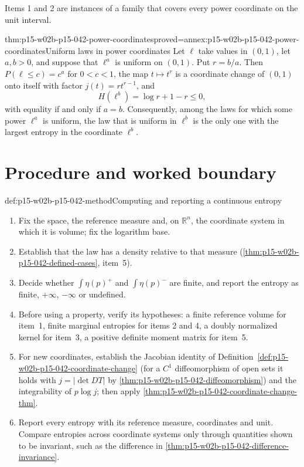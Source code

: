 Items 1 and 2 are instances of a family that covers every power coordinate on
the unit interval.

\begin{hbcorollary}{thm:p15-w02b-p15-042-power-coordinates}{proved=annex:p15-w02b-p15-042-power-coordinates}{Uniform laws in power coordinates}
Let \(\ell\) take values in \((0,1)\), let \(a,b>0\), and suppose that
\(\ell^a\) is uniform on \((0,1)\). Put \(r=b/a\). Then
\(P(\ell\leq c)=c^a\) for \(0<c<1\), the map \(t\mapsto t^r\) is a
coordinate change of \((0,1)\) onto itself with factor \(j(t)=rt^{r-1}\),
and
\[
 H(\ell^b)=\log r+1-r\leq0 ,
\]
with equality if and only if \(a=b\). Consequently, among the laws for which
some power \(\ell^a\) is uniform, the law that is uniform in \(\ell^b\) is the
only one with the largest entropy in the coordinate \(\ell^b\).
\end{hbcorollary}

\section{Procedure and worked boundary}
\label{sec:p15-w02b-p15-042-procedure}

\begin{hbmethod}{def:p15-w02b-p15-042-method}{Computing and reporting a continuous entropy}
\begin{enumerate}
\item Fix the space, the reference measure and, on \(\mathbb R^n\), the
      coordinate system in which it is volume; fix the logarithm base.
\item Establish that the law has a density relative to that measure
      (\cref{thm:p15-w02b-p15-042-defined-cases}, item~5).
\item Decide whether \(\int\eta(p)^+\) and \(\int\eta(p)^-\) are finite, and
      report the entropy as finite, \(+\infty\), \(-\infty\) or undefined.
\item Before using a property, verify its hypotheses: a finite reference
      volume for item~1, finite marginal entropies for items 2 and 4, a
      doubly normalized kernel for item~3, a positive definite moment matrix
      for item~5.
\item For new coordinates, establish the Jacobian identity of
      Definition~\ref{def:p15-w02b-p15-042-coordinate-change} (for a
      \(C^1\) diffeomorphism of open sets it holds with
      \(j=|\det DT|\) by \cref{thm:p15-w02b-p15-042-diffeomorphism}) and the
      integrability of \(p\log j\); then apply
      \cref{thm:p15-w02b-p15-042-coordinate-change-thm}.
\item Report every entropy with its reference measure, coordinates and unit.
      Compare entropies across coordinate systems only through quantities
      shown to be invariant, such as the difference in
      \cref{thm:p15-w02b-p15-042-difference-invariance}.
\end{enumerate}
\end{hbmethod}

